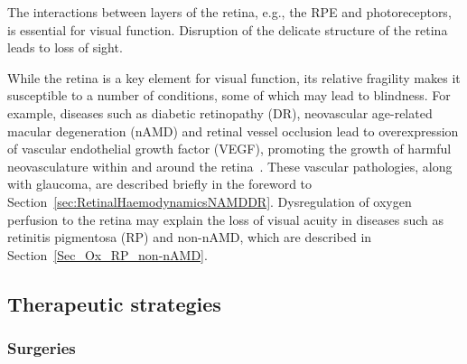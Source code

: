 \documentclass{article}
\begin{document}
The interactions between layers of the retina, e.g., the RPE and photoreceptors, is essential for visual function.
Disruption of the delicate structure of the retina leads to loss of sight.

While the retina is a key element for visual function, its relative fragility makes it susceptible to a number of conditions, some of which may lead to blindness.
For example, diseases such as diabetic retinopathy (DR), neovascular age-related macular degeneration (nAMD) and retinal vessel occlusion lead to overexpression of vascular endothelial growth factor (VEGF), promoting the growth of harmful neovasculature within and around the retina~\cite{Medina_2016}.
These vascular pathologies, along with glaucoma, are described briefly in the foreword to Section~\ref{sec:RetinalHaemodynamicsNAMDDR}.
Dysregulation of oxygen perfusion to the retina may explain the loss of visual acuity in diseases such as retinitis pigmentosa (RP) and non-nAMD, which are described in Section~\ref{Sec_Ox_RP_non-nAMD}.

\subsection{Therapeutic strategies}

\subsubsection{Surgeries}

\end{document}

